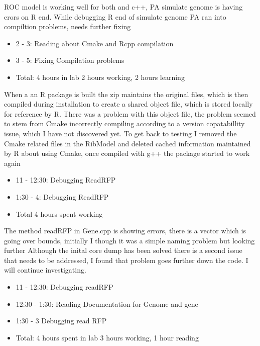 \documentclass[12pt,hyperref]{labbook}
\begin{document}
ROC model is working well for both and c++, PA simulate genome is having erors on R end.
While debugging R end of simulate genome PA ran into compiltion problems, needs further fixing
\begin{itemize}
    \item 2 - 3: Reading about Cmake and Rcpp compilation
    \item 3 - 5: Fixing Compilation problems
    \item Total: 4 hours in lab 2 hours working, 2 hours learning
\end{itemize}
When a an R package is built the zip maintains the original files, which is then compiled during installation to create a 
shared object file, which is stored locally for reference by R. There was a problem with this object file, the problem 
seemed to stem from Cmake incorrectly compiling according to a version copatabillity issue, which I have not discovered yet.
To get back to testing I removed the Cmake related files in the RibModel and deleted cached information maintained by R about 
using Cmake, once compiled with g++ the package started to work again
\begin{itemize}
    \item 11 - 12:30: Debugging ReadRFP
    \item 1:30 - 4: Debugging ReadRFP
    \item Total 4 hours spent working
\end{itemize}
The method readRFP in Gene.cpp is showing errors, there is a vector which is going over bounds, initially I though it was a simple naming problem but looking further Although the inital core dump has been solved there is a second issue that needs to be addressed, I found that problem goes further down the code. I will continue investigating.
\begin{itemize}
    \item 11 - 12:30: Debugging readRFP
    \item 12:30 - 1:30: Reading Documentation for Genome and gene
    \item 1:30 - 3 Debugging read RFP
    \item Total: 4 hours spent in lab 3 hours working, 1 hour reading
\end{itemize}
\end{document}
